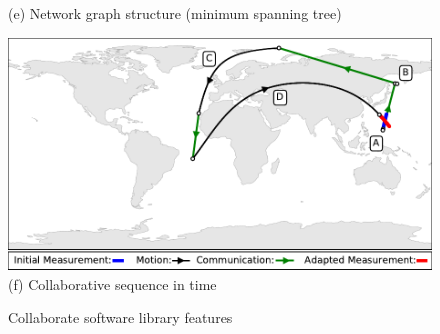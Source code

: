 \documentclass[conference]{IEEEtran}
\begin{document}
\begin{figure}[b!]
\begin{minipage}[b]{\linewidth}
\begin{center}
      {\footnotesize(e) Network graph structure (minimum spanning tree)}
    \end{center}
    \medskip
  \end{minipage}
  \begin{minipage}[b]{\linewidth}
    \begin{center}
      \includegraphics[width=\textwidth]{images/collaborate.pdf}
      {\footnotesize(f) Collaborative sequence in time}
    \end{center}
  \end{minipage}
  \caption{Collaborate software library features}
  \label{fig:features}
\end{figure}
\end{document}
